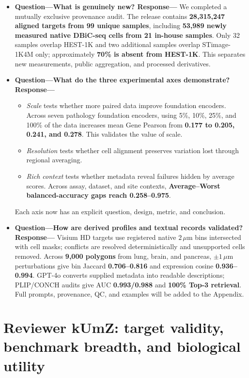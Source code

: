 \documentclass[10pt]{article}
\begin{document}
\begin{itemize}
\item \textbf{Question---What is genuinely new? Response---}
We completed a mutually exclusive provenance audit. The release contains
\textbf{28,315,247 aligned targets from 99 unique samples}, including
\textbf{53,989 newly measured native DBiC-seq cells from 21 in-house samples}.
Only 32 samples overlap HEST-1K and two additional samples overlap
STimage-1K4M only; approximately \textbf{70\% is absent from HEST-1K}. This
separates new measurements, public aggregation, and processed derivatives.

\item \textbf{Question---What do the three experimental axes demonstrate?
Response---}
\begin{itemize}
\item \textit{Scale} tests whether more paired data improve foundation
encoders. Across seven pathology foundation encoders, using 5\%, 10\%, 25\%,
and 100\% of the data increases mean Gene Pearson from
\textbf{0.177 to 0.205, 0.241, and 0.278}. This validates the value of scale.
\item \textit{Resolution} tests whether cell alignment preserves variation
lost through regional averaging.
\item \textit{Rich context} tests whether metadata reveal failures hidden by
average scores. Across assay, dataset, and site contexts,
\textbf{Average--Worst balanced-accuracy gaps reach 0.258--0.975}.
\end{itemize}
Each axis now has an explicit question, design, metric, and conclusion.

\item \textbf{Question---How are derived profiles and textual records
validated? Response---}
Visium HD targets use registered native \(2\,\mu\mathrm{m}\) bins intersected
with cell masks; conflicts are resolved deterministically and unsupported
cells removed. Across \textbf{9,000 polygons} from lung, brain, and pancreas,
\(\pm1\,\mu\mathrm{m}\) perturbations give bin Jaccard
\textbf{0.706--0.816} and expression cosine \textbf{0.936--0.994}. GPT-4o
converts supplied metadata into readable descriptions; PLIP/CONCH audits give
AUC \textbf{0.993/0.988} and \textbf{100\% Top-3 retrieval}. Full prompts,
provenance, QC, and examples will be added to the Appendix.
\end{itemize}

\section*{Reviewer kUmZ: target validity, benchmark breadth, and biological
utility}
\end{document}
